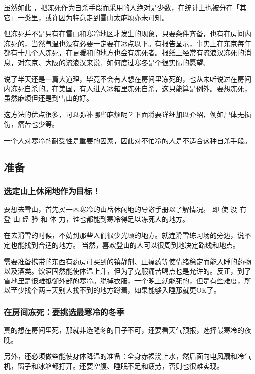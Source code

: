 \documentclass[UTF8]{ctexart}
\begin{document}
虽然如此 ，把冻死作为自杀手段而采用的人绝对是少数，在统计上也被分在「其它」一类里，或许因为特意走到雪山太麻烦亦未可知。

但冻死并不是只有在雪山和寒冷地区才发生的现象，只要条件齐备，也有在房间内冻死的，当然气温也没有必要一定要在冰点以下。有报告显示，事实上在东京每年都有十几个人冻死，在更暖和的地方也会有冻死者。报纸上经常有流浪汉冻死的消息，对东京、大阪的流浪汉来说，如何度过寒冬是个很实际的愿望。

说了半天还是一篇大道理，毕竟不会有人想在房间里冻死的，也从未听说过在房间内冻死自杀的。在美国，有人进入冰箱里冻死自杀，这只能算是例外。要想冻死，虽然麻烦但还是到雪山的好。

这方法的优点很多，可以弥补哪些麻烦呢？下面将要详细加以介绍，例如尸体无损伤，痛苦也少等。

一个人对寒冷的耐受性是重要的因素，因此对不怕冷的人是不适合这种自杀手段。

\subsection{准备}

\subsubsection*{选定山上休闲地作为目标！}

要想去雪山，首先买一本寒冷的山岳休闲地的导游手册以了解情况。
即 使 没 有 登 山 经 验 和 体 力，谁也都能到寒冷得足以冻死人的地方。

在去滑雪的时候，不妨到那些人们很少光顾的地方。就连滑雪练习场的旁边，说不定也能找到合适的地方。
当然，喜欢登山的人可以很周到地决定路线和地点。 

需要准备携带的东西有药房可买到的镇静剂、止痛药等使情绪稳定而能入睡的药物以及酒类。饮酒固然能使体温上升，但为了克服痛苦喝点也是允许的。反正，到了雪地里是很难抵御外部的寒冷。脱掉衣服，一个晚上就能死的，但是有些难度，所以至少找个两三天别人找不到的地方蹲着，如果能够入睡那就更OK了。

\subsubsection*{在房间冻死：要挑选最寒冷的冬季}

真的想在房间里死，那就非选隆冬的日子不可，还要看天气预报，选择最寒冷的夜晚。

另外，还必须做些能使身体降温的准备：全身赤裸浇上水，然后面向电风扇和冷气机，窗子和冰箱都打开。还要空腹、睡眠不足和疲劳，否则也很难实现。
\end{document}
